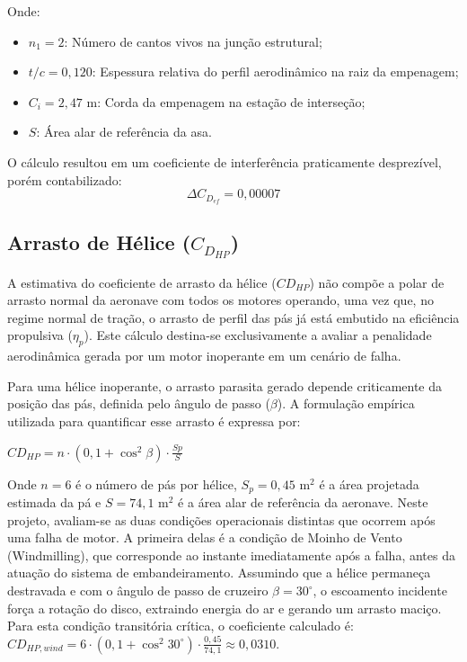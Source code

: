 Onde:
\begin{itemize}
    \item $n_1 = 2$: Número de cantos vivos na junção estrutural;
    \item $t/c = 0,120$: Espessura relativa do perfil aerodinâmico na raiz da empenagem;
    \item $C_i = 2,47$ m: Corda da empenagem na estação de interseção;
    \item $S$: Área alar de referência da asa.
\end{itemize}

O cálculo resultou em um coeficiente de interferência praticamente desprezível, porém contabilizado:
\begin{equation}
    \Delta C_{D_{ef}} = 0,00007
\end{equation}

\subsection{Arrasto de Hélice ($C_{D_{HP}}$)}

A estimativa do coeficiente de arrasto da hélice ($CD_{HP}$) não compõe a polar de arrasto normal da aeronave com todos os motores operando, uma vez que, no regime normal de tração, o arrasto de perfil das pás já está embutido na eficiência propulsiva ($\eta_p$). Este cálculo destina-se exclusivamente a avaliar a penalidade aerodinâmica gerada por um motor inoperante em um cenário de falha.

Para uma hélice inoperante, o arrasto parasita gerado depende criticamente da posição das pás, definida pelo ângulo de passo ($\beta$). A formulação empírica utilizada para quantificar esse arrasto é expressa por:

$CD_{HP} = n \cdot (0,1 + \cos^2 \beta) \cdot \frac{Sp}{S}$

Onde $n = 6$ é o número de pás por hélice, $S_p = 0,45 \text{ m}^2$ é a área projetada estimada da pá e $S = 74,1 \text{ m}^2$ é a área alar de referência da aeronave.  Neste projeto, avaliam-se as duas condições operacionais distintas que ocorrem após uma falha de motor. A primeira delas é a condição de Moinho de Vento (Windmilling), que corresponde ao instante imediatamente após a falha, antes da atuação do sistema de embandeiramento. Assumindo que a hélice permaneça destravada e com o ângulo de passo de cruzeiro $\beta = 30^\circ$, o escoamento incidente força a rotação do disco, extraindo energia do ar e gerando um arrasto maciço. Para esta condição transitória crítica, o coeficiente calculado é:  $CD_{HP, wind} = 6 \cdot (0,1 + \cos^2 30^\circ) \cdot \frac{0,45}{74,1} \approx 0,0310$. 

